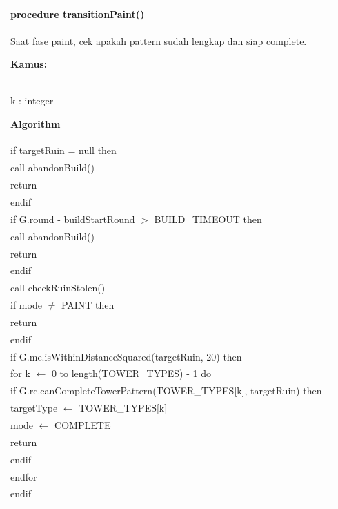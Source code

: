 \documentclass{article}
\newenvironment{pseudobox}
{
\centering
\begin{longtable}{|p{0.94\linewidth}|}
\hline
}
{
\\ \hline
\end{longtable}
\vspace{0.05cm}
}
\begin{document}
\begin{pseudobox}
\textbf{procedure transitionPaint()} \\
{ Saat fase paint, cek apakah pattern sudah lengkap dan siap complete. }

\textbf{Kamus:} \\
\hspace*{1em} k : integer

\textbf{Algorithm} \\
\hspace*{1em} if targetRuin = null then \\
\hspace*{2em} call abandonBuild() \\
\hspace*{2em} return \\
\hspace*{1em} endif \\

\hspace*{1em} if G.round - buildStartRound $>$ BUILD\_TIMEOUT then \\
\hspace*{2em} call abandonBuild() \\
\hspace*{2em} return \\
\hspace*{1em} endif \\

\hspace*{1em} call checkRuinStolen() \\

\hspace*{1em} if mode $\neq$ PAINT then \\
\hspace*{2em} return \\
\hspace*{1em} endif \\

\hspace*{1em} if G.me.isWithinDistanceSquared(targetRuin, 20) then \\
\hspace*{2em} for k $\leftarrow$ 0 to length(TOWER\_TYPES) - 1 do \\
\hspace*{3em} if G.rc.canCompleteTowerPattern(TOWER\_TYPES[k], targetRuin) then \\
\hspace*{4em} targetType $\leftarrow$ TOWER\_TYPES[k] \\
\hspace*{4em} mode $\leftarrow$ COMPLETE \\
\hspace*{4em} return \\
\hspace*{3em} endif \\
\hspace*{2em} endfor \\
\hspace*{1em} endif
\end{pseudobox}
\end{document}

